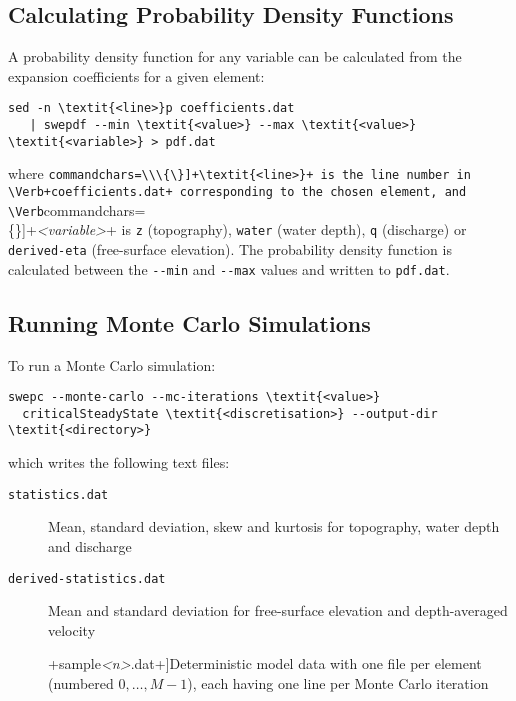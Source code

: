 \subsection{Calculating Probability Density Functions}
A probability density function for any variable can be calculated from the expansion coefficients for a given element:
\begin{Verbatim}[commandchars=\\\{\}]
sed -n \textit{<line>}p coefficients.dat
   | swepdf --min \textit{<value>} --max \textit{<value>} \textit{<variable>} > pdf.dat
\end{Verbatim}
where \Verb[commandchars=\\\{\}]+\textit{<line>}+ is the line number in \Verb+coefficients.dat+ corresponding to the chosen element, and \Verb[commandchars=\\\{\}]+\textit{<variable>}+ is \Verb+z+ (topography), \Verb+water+ (water depth), \Verb+q+ (discharge) or \Verb+derived-eta+ (free-surface elevation).
The probability density function is calculated between the \Verb+--min+ and \Verb+--max+ values and written to \Verb+pdf.dat+. 

\subsection{Running Monte Carlo Simulations}
To run a Monte Carlo simulation:
\begin{Verbatim}[commandchars=\\\{\}]
swepc --monte-carlo --mc-iterations \textit{<value>}
  criticalSteadyState \textit{<discretisation>} --output-dir \textit{<directory>}
\end{Verbatim}
which writes the following text files:
\begin{description}
\item[\Verb+statistics.dat+]{Mean, standard deviation, skew and kurtosis for topography, water depth and discharge}
\item[\Verb+derived-statistics.dat+]{Mean and standard deviation for free-surface elevation and depth-averaged velocity}
\cprotect\item[\Verb[commandchars=\\\{\}]+sample\textit{<n>}.dat+]{Deterministic model data with one file per element (numbered $0, \ldots, M-1$), each having one line per Monte Carlo iteration}
\end{description}